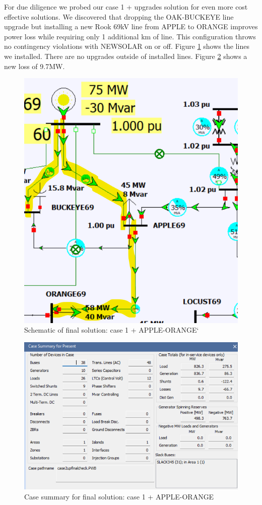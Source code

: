 \documentclass[conference]{IEEEtran}
\begin{document}
For due diligence we probed our case 1 + upgrades solution for even more cost effective solutions. We discovered that dropping the OAK-BUCKEYE line upgrade but installing a new Rook 69kV line from APPLE to ORANGE improves power loss while requiring only 1 additional km of line. This configuration throws no contingency violations with NEWSOLAR on or off. Figure \ref{fig:case1plusnewline} shows the lines we installed. There are no upgrades outside of installed lines. Figure \ref{fig:case1plusnewlineloss} shows a new loss of 9.7MW. 
\begin{figure}[h]
	\centering
	\includegraphics[width=.7\linewidth]{figures/case1_plusnewline}
	\caption{Schematic of final solution: case 1 + APPLE-ORANGE`}
	\label{fig:case1plusnewline}
\end{figure}
\begin{figure}[h]
	\centering
	\includegraphics[width=1\linewidth]{figures/case1_plusnewline_loss}
	\caption{Case summary for final solution: case 1 + APPLE-ORANGE}
	\label{fig:case1plusnewlineloss}
\end{figure}
\end{document}

